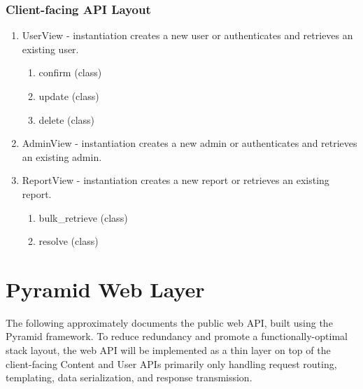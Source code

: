\documentclass[12pt,letterpaper]{article}
\begin{document}
\subsubsection{Client-facing API Layout}

\begin{enumerate}
\item[] UserView - instantiation creates a new user or authenticates and retrieves an existing user. 
\begin{enumerate}
\item[] confirm (class)
\item[] update (class)
\item[] delete (class)
\end{enumerate}
\item[] AdminView - instantiation creates a new admin or authenticates and retrieves an existing admin.
\item[] ReportView - instantiation creates a new report or retrieves an existing report. 
\begin{enumerate}
\item[] bulk\_retrieve (class)
\item[] resolve (class)
\end{enumerate}
\end{enumerate}



\section{Pyramid Web Layer}

The following approximately documents the public web API, built using the Pyramid framework. To reduce redundancy and promote a functionally-optimal stack layout, the web API will be implemented as a thin layer on top of the client-facing Content and User APIs primarily only handling request routing, templating, data serialization, and response transmission.
\end{document}
